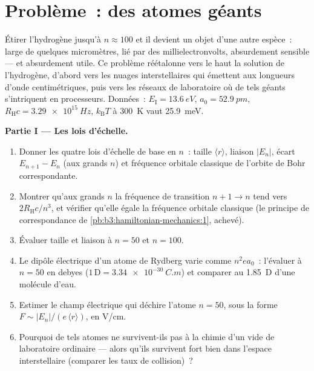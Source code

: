 \section{Problème~: des atomes géants}

\begin{problem}\label{pb:b3:hydrogen-atom:1}
Étirer l'hydrogène jusqu'à $n \approx 100$ et il devient un objet
d'une autre espèce~: large de quelques micromètres, lié par des
millielectronvolts, absurdement sensible --- et absurdement utile. Ce
problème réétalonne vers le haut la solution de l'hydrogène, d'abord
vers les nuages interstellaires qui émettent aux longueurs d'onde
centimétriques, puis vers les réseaux de laboratoire où de tels géants
s'intriquent en processeurs. Données~:
$E_{\text{I}} = \qty{13.6}{eV}$, $a_0 = \qty{52.9}{pm}$,
$R_{\text{H}}c = \qty{3.29e15}{Hz}$, $k_{\text{B}}T$ à
\qty{300}{K} vaut \qty{25.9}{meV}.

\medskip\noindent\textbf{Partie I --- Les lois d'échelle.}
\begin{enumerate}
  \item Donner les quatre lois d'échelle de base en $n$~: taille $\langle
        r\rangle$, liaison $|E_n|$, écart $E_{n+1} - E_n$ (aux grands
        $n$) et fréquence orbitale classique de l'orbite de Bohr
        correspondante.
  \item Montrer qu'aux grands $n$ la fréquence de transition $n+1 \to
        n$ tend vers $2R_{\text{H}}c/n^3$, et vérifier qu'elle égale
        la fréquence orbitale classique (le principe de
        correspondance de \cref{pb:b3:hamiltonian-mechanics:1},
        achevé).
  \item Évaluer taille et liaison à $n = 50$ et $n = 100$.
  \item Le dipôle électrique d'un atome de Rydberg varie comme
        $n^2ea_0$~: l'évaluer à $n = 50$ en debyes ($1\,\text{D} =
        \qty{3.34e-30}{C.m}$) et comparer au \qty{1.85}{D} d'une
        molécule d'eau.
  \item Estimer le champ électrique qui déchire l'atome $n = 50$,
        sous la forme $F \sim |E_n|/(e\,\langle r\rangle)$, en V/cm.
  \item Pourquoi de tels atomes ne survivent-ils pas à la chimie d'un
        vide de laboratoire ordinaire --- alors qu'ils survivent fort
        bien dans l'espace interstellaire (comparer les taux de
        collision)~?
\end{enumerate}


\end{problem}
